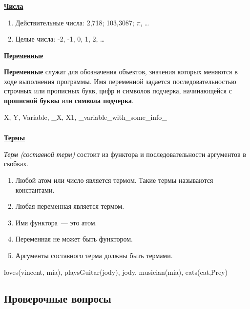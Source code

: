 \begin{frame}
	\frametitle{\insertsection}
	\framesubtitle{\insertsubsection}
	\textbf{\underline{Числа}}
	
	\begin{enumerate}
		\item Действительные числа: 2,718; 103,3087; \(\pi \), \ldots
		\item Целые числа: -2, -1, 0, 1, 2, \ldots
	\end{enumerate}

	\textbf{\underline{Переменные}}
	
	
	\textbf{Переменные} служат для обозначения объектов, значения которых меняются в ходе выполнения программы. Имя переменной задается
	последовательностью строчных или прописных букв, цифр и символов подчерка, начинающейся с \textbf{прописной буквы} или \textbf{символа подчерка}.
	
	\begin{rexample}
		X, Y, Variable, \_X, X1, \_variable\_with\_some\_info\_
	\end{rexample}
\end{frame}

\begin{frame}
	\frametitle{\insertsection}
	\framesubtitle{\insertsubsection}
	\textbf{\underline{Термы}}
	
	\textit{Терм (составной терм)} состоит из \alert{функтора} и последовательности аргументов в скобках.
	\begin{enumerate}
		\item Любой атом или число является термом. Такие термы называются \alert{константами}.
		\item Любая переменная является термом.
		\item Имя функтора~--- это атом.
		\item Переменная не может быть функтором.
		\item Аргументы составного терма должны быть термами.
	\end{enumerate}

	\begin{rexample}
		loves(vincent, mia), playsGuitar(jody), jody, musician(mia), eats(cat,Prey)
	\end{rexample}
\end{frame}

\subsection{Проверочные вопросы}

